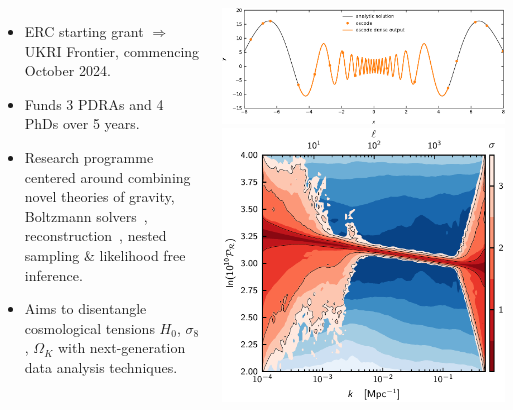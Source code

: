 \documentclass[aspectratio=169, handout]{beamer}
\begin{document}
\begin{frame}
    \begin{columns}
        \begin{itemize}
            \item ERC starting grant $\Rightarrow$ UKRI Frontier, commencing October 2024.
            \item Funds 3 PDRAs and 4 PhDs over 5 years.
            \item Research programme centered around combining novel theories of gravity, Boltzmann solvers~, reconstruction~, nested sampling \& likelihood free inference.
            \item Aims to disentangle cosmological tensions $H_0$, $\sigma_8$, $\Omega_K$ with next-generation data analysis techniques.
        \end{itemize}
        \includegraphics[width=\textwidth]{figures/denseoutput.pdf}
        \includegraphics[width=\textwidth]{figures/pps.pdf}

\end{columns}
\end{frame}
\end{document}
